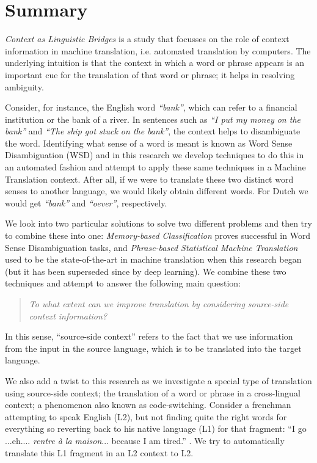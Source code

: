 \chapter*{Summary}

\emph{Context as Linguistic Bridges} is a study that focusses on the role of
context information in machine translation, i.e. automated translation by computers.  The
underlying intuition is that the context in which a word or phrase appears is
an important cue for the translation of that word or phrase; it helps in
resolving ambiguity.

Consider, for instance, the English word \emph{``bank''}, which can refer to a
financial institution or the bank of a river. In sentences such as \emph{``I
put my money on the bank''} and \emph{``The ship got stuck on the bank''}, the
context helps to disambiguate the word. Identifying what sense of a word is meant is known as Word Sense
Disambiguation (WSD) and in this research we develop techniques to do this
in an automated fashion and attempt to apply these same techniques in a Machine
Translation context. After all, if we were to translate these two distinct
word senses to another language, we would likely obtain different words. For
Dutch we would get \emph{``bank''} and \emph{``oever''}, respectively.

We look into two particular solutions to solve two different problems and then
try to combine these into one: \emph{Memory-based Classification} proves
successful in Word Sense Disambiguation tasks, and \emph{Phrase-based
Statistical Machine Translation} used to be the state-of-the-art in machine
translation when this research began (but it has been superseded since by deep
learning). We combine these two techniques and attempt to answer the following main
question:

\begin{quote}
\emph{To what extent can we improve translation by considering source-side context information?}
\end{quote}

In this sense, ``source-side context'' refers to the fact that we use
information from the input in the source language, which is to be translated
into the target language.

We also add a twist to this research as we investigate a special type of
translation using source-side context; the translation of a word or phrase in a
cross-lingual context; a phenomenon also known as code-switching. Consider a
frenchman attempting to speak English (L2), but not finding quite the right
words for everything so reverting back to his native language (L1) for that
fragment: ``I go ...eh.... \emph{rentre à la maison}... because I am tired.''
. We try to automatically translate this L1 fragment in an L2 context to L2.

